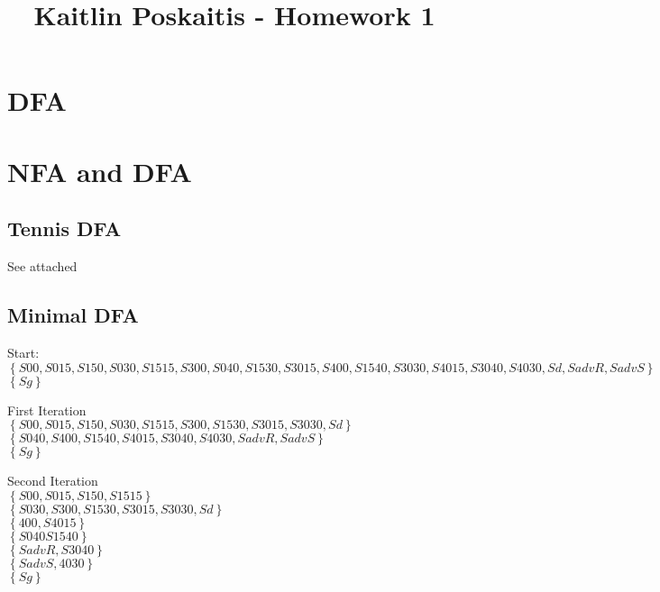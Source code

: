 \documentclass[11pt]{article}
\title{\bf Kaitlin Poskaitis - Homework 1}
\author{}
\date{}
\begin{document}
\maketitle

\section{DFA}

\section{NFA and DFA}
\subsection{Tennis DFA}

See attached


\subsection{Minimal DFA}
\indent Start:\\
$\left\{
    { S00, S015, S150, S030, S1515, S300, S040, S1530, S3015, S400, S1540,
    S3030, S4015, S3040, S4030, Sd, SadvR, SadvS}
\right\}$\\
$\left\{
    {Sg}
\right\}$

\vspace{5mm}

First Iteration\\
$\left\{
    { S00, S015, S150, S030, S1515, S300, S1530, S3015,
    S3030, Sd}
\right\}$\\
$\left\{
    { S040, S400, S1540,
    S4015, S3040, S4030, SadvR, SadvS}
\right\}$\\
$\left\{
    {Sg}
\right\}$

\vspace{5mm}

Second Iteration\\
$\left\{
    { S00, S015, S150, S1515}
\right\}$\\
$\left\{
    { S030, S300, S1530, S3015, S3030, Sd}
\right\}$\\
$\left\{
    { 400,S4015}
\right\}$\\
$\left\{
    { S040 S1540}
\right\}$\\
$\left\{
    {SadvR, S3040}
\right\}$\\
$\left\{
    { SadvS, 4030}
\right\}$\\
$\left\{
    {Sg}
\right\}$

\vspace{5mm}
\end{document}
